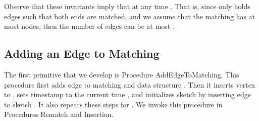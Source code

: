 \documentclass[11pt,letter]{article}
\newtheorem{lemma}[theorem]{Lemma}
\newcommand{\COMMENTED}[1]{{}}
\newcommand{\junk}[1]{\COMMENTED{#1}}
\begin{document}
Observe that these invariants imply that at any time
.
That is, since  only holds edges such that both ends are
matched, and we assume that the matching has at most  nodes, then
the number of edges can be at most .

\junk{
\begin{lemma}
\label{lem:size:tree}
Suppose Invariant  holds at a time .
Then, at time , we have .
\end{lemma}

\begin{proof}
At every time of stream , for the size of a maximal matching  we have .
Thus .
Using Invariant , every edge  at time  is in  if
 and  are both matched. Therefore, 
for .
\end{proof}
}







\subsection{Adding an Edge to Matching }
The first primitive that we develop is Procedure
{\sf AddEdgeToMatching}.
This procedure first adds edge  to matching  and data structure .
Then it inserts vertex  to , sets timestamp  to the current time
, and initializes sketch  by inserting
edge  to sketch .
It also repeats these steps for .
We invoke this procedure in Procedures {\sf Rematch}
and {\sf Insertion}.


\begin{center}
\end{center}



\begin{center}
\end{center}
\end{document}
